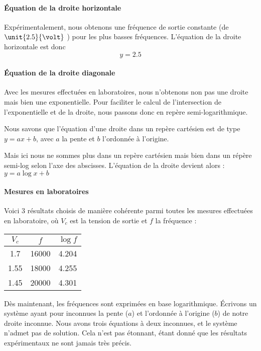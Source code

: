\paragraph{Équation de la droite horizontale}
Expérimentalement, nous obtenons une fréquence de sortie constante (de $\unit{2.5}{\volt}$ ) 
pour les plus basses fréquences. L'équation de la droite horizontale est donc \[y=2.5\]

\paragraph{Équation de la droite diagonale}

Avec les mesures effectuées en laboratoires, nous n'obtenons non pas une droite mais bien une exponentielle. 
Pour faciliter le calcul de l'intersection de l'exponentielle et de la droite, nous passons donc en repère 
semi-logarithmique. 

Nous savons que l'équation d'une droite dans un repère cartésien est de type $y=ax+b$, avec $a$ la pente 
et $b$ l'ordonnée à l'origine.

Mais ici nous ne sommes plus dans un repère cartésien mais bien dans un répère semi-log selon l'axe des 
abscisses. L'équation de la droite devient alors : $y=a\log{x}+b$

\paragraph{Mesures en laboratoires}

Voici 3 résultats choisis de manière cohérente parmi toutes les mesures effectuées en laboratoire, où 
$V_c$ est la tension de sortie et $f$ la fréquence :

\begin{center}
\begin{tabular}{|c|c|c|}
\hline
$V_c$ & $f$ & $\log{f}$ \\
\hline
1.7 & 16000 & 4.204 \\
\hline
1.55 & 18000 & 4.255 \\
\hline
1.45 & 20000 & 4.301 \\
\hline
\end{tabular}
\end{center}

Dès maintenant, les fréquences sont exprimées en base logarithmique.
Écrivons un système ayant pour inconnues la pente ($a$) et l'ordonnée à l'origine ($b$) de notre droite 
inconnue.
Nous avons trois équations à deux inconnues, et le système n'admet pas de solution.
Cela n'est pas étonnant, étant donné que les résultats expérimentaux ne sont jamais très précis.

